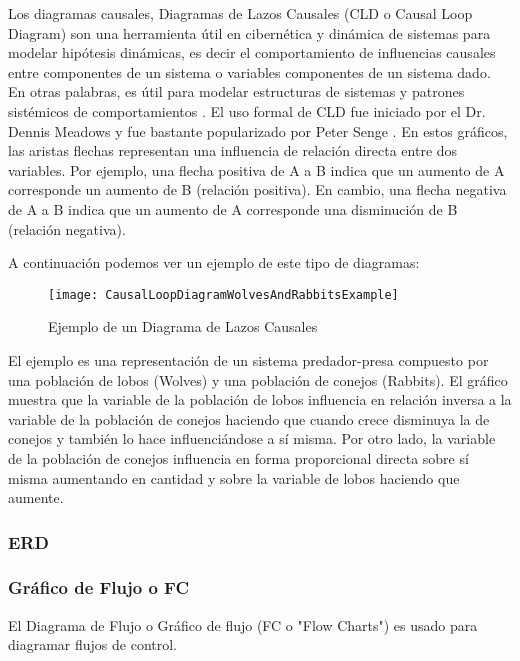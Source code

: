 Los diagramas causales, Diagramas de Lazos Causales (CLD o Causal Loop Diagram) son una herramienta útil en cibernética y dinámica de sistemas para modelar hipótesis dinámicas, es decir el comportamiento de influencias causales entre componentes de un sistema o variables componentes de un sistema dado. En otras palabras, es útil para modelar estructuras de sistemas y patrones sistémicos de comportamientos \cite{Craig-Kirkwood-1998}. El uso formal de CLD fue iniciado por el Dr. Dennis Meadows \cite{Meadows-1974} y fue bastante popularizado por Peter Senge \cite{Peter-Senge-1990}. En estos gráficos, las aristas flechas representan una influencia de relación directa entre dos variables. Por ejemplo, una flecha positiva de A a B indica que un aumento de A corresponde un aumento de B (relación positiva). En cambio, una flecha negativa de A a B indica que un aumento de A corresponde una disminución de B (relación negativa).

A continuación podemos ver un ejemplo de este tipo de diagramas:

\begin{figure}[h]
  \centering
  \texttt{[image: CausalLoopDiagramWolvesAndRabbitsExample]}
  \caption{Ejemplo de un Diagrama de Lazos Causales}
  \centering
  \label{fig:v} %
\end{figure}

El ejemplo es una representación de un sistema predador-presa compuesto por una población de lobos (Wolves) y una población de conejos (Rabbits). El gráfico muestra que la variable de la población de lobos influencia en relación inversa a la variable de la población de conejos haciendo que cuando crece disminuya la de conejos y también lo hace influenciándose a sí misma. Por otro lado, la variable de la población de conejos influencia en forma proporcional directa sobre sí misma aumentando en cantidad y sobre la variable de lobos haciendo que aumente.

\subsubsection{ERD}

\subsubsection{Gráfico de Flujo o FC}

El Diagrama de Flujo o Gráfico de flujo (FC o "Flow Charts") es usado para diagramar flujos de control.

